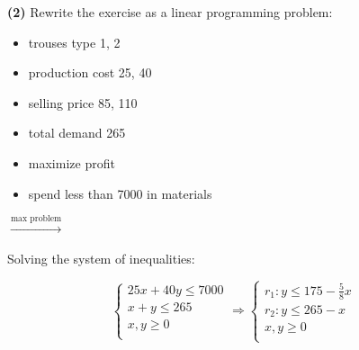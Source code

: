 \documentclass[unicode,11pt,a4paper,oneside,numbers=endperiod,openany]{scrartcl}
\begin{document}
\vspace{0.5cm}
\textbf{(2)}
Rewrite the exercise as a linear programming problem:\\

\begin{minipage}{0.4\textwidth}
	\begin{itemize}
		\setlength\itemsep{0.0em}
		\item trouses type 1, 2
		\item production cost 25, 40
		\item selling price 85, 110
		\item total demand 265
		\item maximize profit
		\item spend less than 7000 in materials
	\end{itemize}
\end{minipage}
\begin{minipage}{0.2\textwidth}
	$\xrightarrow{\text{max problem}}$
\end{minipage}
\vspace{0.5cm}

Solving the system of inequalities:

\begin{equation*}
	\begin{cases}
		25 x + 40 y \leq 7000 \\
		x + y       \leq 265  \\
		x, y        \geq 0    \\
	\end{cases}
	\Rightarrow
	\begin{cases}
		r_1 : y \leq 175 - \frac{5}{8} x \\
		r_2 : y \leq 265 - x             \\
		x, y \geq 0                      \\
	\end{cases}
\end{equation*}
\end{document}
